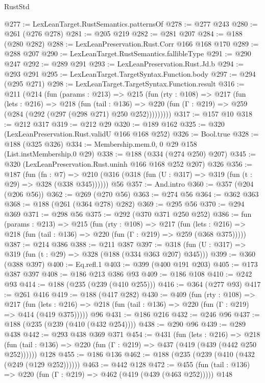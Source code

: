 \begin{lexlean}{RustStd}
\begin{coremodule}
@277 := LexLeanTarget.RustSemantics.patternsOf
@278 := @277 @243
@280 := @261 (@276 @278)
@281 := @205 @219
@282 := @281 @207
@284 := @188 (@280 @282)
@288 := LexLeanPreservation.Rust.Corr @166 @168 @170
@289 := @288 @207
@290 := LexLeanTarget.RustSemantics.fallibleType
@291 := @290 @247
@292 := @289 @291
@293 := LexLeanPreservation.Rust.Jd.b
@294 := @293 @291
@295 := LexLeanTarget.TargetSyntax.Function.body
@297 := @294 (@295 @271)
@298 := LexLeanTarget.TargetSyntax.Function.result
@316 := @211
    (@214
      (fun (params : @213) =>
      @215
        (fun (rty : @108) =>
        @217
          (fun (lets : @216) =>
          @218
            (fun (tail : @136) =>
            @220 (fun (Γ : @219) => @259 (@284 (@292 (@297 (@298 @271) @250 @252)))))))))
@317 := @157 @10
@318 := @212 @317
@319 := @212 @29
@320 := @189 @162
@325 := @320 (LexLeanPreservation.Rust.validU @166 @168 @252)
@326 := Bool.true
@328 := @188 (@325 @326)
@334 := Membership.mem.{0, 0} @29 @158 (List.instMembership.{0} @29)
@338 := @188 (@334 (@274 @250) @207)
@345 := @320 (LexLeanPreservation.Rust.uninh @166 @168 @252 @207) @326
@356 := @187
    (fun (fn : @7) =>
    @210 (@316 (@318 (fun (U : @317) => @319 (fun (t : @29) => @328 (@338 @345))))))
    @56
@357 := And.intro
@360 := @357 (@204 (@206 @56))
@362 := @269 (@270 @56)
@363 := @274 @56
@364 := @362 @363
@368 := @188 (@261 (@364 @278) @282)
@369 := @295 @56
@370 := @294 @369
@371 := @298 @56
@375 := @292 (@370 @371 @250 @252)
@386 := fun (params : @213) =>
  @215
    (fun (rty : @108) =>
    @217
      (fun (lets : @216) => @218 (fun (tail : @136) => @220 (fun (Γ : @219) => @259 (@368 @375)))))
@387 := @214 @386
@388 := @211 @387
@397 := @318 (fun (U : @317) => @319 (fun (t : @29) => @328 (@188 (@334 @363 @207) @345)))
@399 := @360 (@388 @397)
@400 := Eq.refl.{1}
@403 := @399 (@400 @191 @203)
@405 := @173 @387 @397
@408 := @186 @213 @386 @93
@409 := @186 @108
@410 := @242 @93
@414 := @188 (@235 (@239 (@410 @255)))
@416 := @364 (@277 @93)
@417 := @261 @416
@419 := @188 (@417 @282)
@430 := @409
    (fun (rty : @108) =>
    @217
      (fun (lets : @216) => @218 (fun (tail : @136) => @220 (fun (Γ : @219) => @414 (@419 @375)))))
    @96
@431 := @186 @216
@432 := @246 @96
@437 := @188 (@235 (@239 (@410 (@432 @254))))
@438 := @290 @96
@439 := @289 @438
@442 := @293 @438 @369 @371
@454 := @431
    (fun (lets : @216) =>
    @218 (fun (tail : @136) => @220 (fun (Γ : @219) => @437 (@419 (@439 (@442 @250 @252))))))
    @128
@455 := @186 @136
@462 := @188 (@235 (@239 (@410 (@432 (@249 (@129 @252))))))
@463 := @442 @128
@472 := @455 (fun (tail : @136) => @220 (fun (Γ : @219) => @462 (@419 (@439 (@463 @252))))) @148

\end{coremodule}
\end{lexlean}
